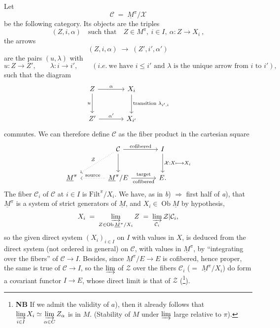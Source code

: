 
Let
\[ \mathcal{C} \;=\; \underline{M}^\pi/\mathcal{X} \]
be the following category. Its objects are the triples
\[ (Z,i,\alpha) \quad \text{such that} \quad Z\in M^\pi,\ i\in I,\ \alpha : Z\longrightarrow X_i \ , \]
the arrows
\[ (Z,i,\alpha) \;\longrightarrow\; (Z',i',\alpha') \]
are the pairs $(u,\lambda)$ with
\[ u : Z\longrightarrow Z', \qquad \lambda : i\longrightarrow i', \qquad (\textit{i.e.}\ \text{we have } i\le i' \text{ and } \lambda \text{ is the unique arrow from } i \text{ to } i'), \]
such that the diagram
\[
\begin{tikzcd}[row sep=large, column sep=large]
Z \arrow[r,"\alpha"] \arrow[d,"u"'] & X_i \arrow[d,"\text{transition } \lambda_{i',i}"] \\
Z' \arrow[r,"\alpha'"] & X_{i'}
\end{tikzcd}
\]
commutes. We can therefore define $\mathcal{C}$ as the fiber product in the cartesian square
\[
\begin{tikzcd}[row sep=large, column sep=large]
 & \mathcal{C} \arrow[r,"\text{cofibered}"] \arrow[d] \arrow[dl,dotted,"\mathcal{Z}"'] & I \arrow[d,"\mathcal{X} : X \longmapsto X_i"] \\ %
\underline{M}^\pi & \underline{M}^\pi/E \arrow[l,dotted,"\text{source}"'] \arrow[r,"\text{target}","\text{cofibered}"'] & E.
\end{tikzcd}
\]
The fiber $\mathcal{C}_i$ of $\mathcal{C}$ at $i\in I$ is $\mathrm{Filt}^\pi/X_i$. We have, as in \textit{b}) $\Longrightarrow$ first half of \textit{a}), that $\underline{M}^\pi$ is a
system of strict generators of $\underline{M}$, and $X_i\in\operatorname{Ob}\underline{M}$ by hypothesis,
\[ X_i \;=\; \varinjlim_{Z\in\operatorname{Ob}\underline{M}^\pi/X_i} Z \;=\; \varinjlim_{\mathcal{C}_i}\mathcal{Z}|\mathcal{C}_i, \]
so the given direct system $(X_i)_{i\in I}$ on $I$ with values in $X$, is deduced from the direct system (not ordered in general) on $\mathcal{C}$, with values in $\underline{M}^\pi$, by ``integrating over the fibers'' of $\mathcal{C}\longrightarrow I$. Besides, since $\underline{M}^\pi/E\longrightarrow E$ is cofibered, hence proper, the same is true of $\mathcal{C}\longrightarrow I$, so the $\varinjlim$ of $\mathcal{Z}$ over the fibers $\mathcal{C}_i$ ($=$ $\underline{M}^\pi/X_i$) do form a covariant functor $I\longrightarrow E$, whose direct limit is that of $\mathcal{Z}$ (\footnote[43]{\textbf{NB} If we admit the validity of $a$), then it already follows that $\varinjlim\limits_{i\in I} X_i \simeq \varinjlim\limits_{\alpha\in C} Z_\alpha$ is in $M$. (Stability of $M$ under $\varinjlim$ large relative to $\pi$).}).

